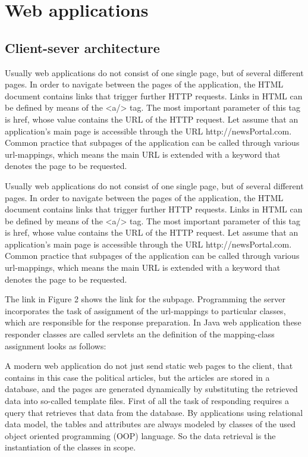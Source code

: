 \section{Web applications}

\subsection{Client-sever architecture}

Usually web applications do not consist of one single page, but of several different pages. In order to navigate between the pages of the application, the HTML document contains links that trigger further HTTP requests. Links in HTML can be defined by means of the <a/> tag.  The most important parameter of this tag is href, whose value contains the URL of the HTTP request. 
Let assume that an application’s main page is accessible through the URL http://newsPortal.com. Common practice that subpages of the application can be called through various url-mappings, which means the main URL is extended with a keyword that denotes the page to be requested. 


Usually web applications do not consist of one single page, but of several different pages. In order to navigate between the pages of the application, the HTML document contains links that trigger further HTTP requests. Links in HTML can be defined by means of the <a/> tag.  The most important parameter of this tag is href, whose value contains the URL of the HTTP request. 
Let assume that an application’s main page is accessible through the URL http://newsPortal.com. Common practice that subpages of the application can be called through various url-mappings, which means the main URL is extended with a keyword that denotes the page to be requested. 


The link in Figure 2 shows the link for the subpage. Programming the server incorporates the task of assignment of the url-mappings to particular classes, which are responsible for the response preparation. In Java web application these responder classes are called servlets an the definition of the mapping-class assignment looks as follows:


A modern web application do not just send static web pages to the client, that contains in this case the political articles, but the articles are stored in a database, and the pages are generated dynamically by substituting the retrieved data into so-called template files. 
First of all the task of responding requires a query that retrieves that data from the database. By applications using relational data model, the tables and attributes are always modeled by classes of the used object oriented programming (OOP) language. So the data retrieval is the instantiation of the classes in scope. 

